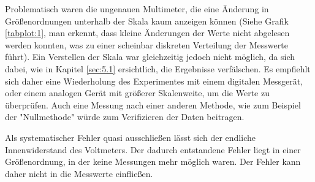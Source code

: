 Problematisch waren die ungenauen Multimeter, die eine Änderung in Größenordnungen unterhalb
der Skala kaum anzeigen können (Siehe Grafik \ref{tabplot:1}, man erkennt, dass kleine Änderungen
der Werte nicht abgelesen werden konnten, was zu einer scheinbar diskreten Verteilung der Messwerte führt).
Ein Verstellen der Skala war gleichzeitig jedoch nicht möglich, da sich dabei,
wie in Kapitel \ref{sec:5.1} ersichtlich, die Ergebnisse verfälschen. Es empfiehlt sich daher
eine Wiederholung des Experimentes mit einem digitalen Messgerät, oder einem analogen Gerät mit
größerer Skalenweite, um die Werte zu überprüfen. Auch eine Messung nach einer anderen Methode, wie
zum Beispiel der "Nullmethode" würde zum Verifizieren der Daten beitragen.

Als systematischer Fehler quasi ausschließen lässt sich der endliche Innenwiderstand des Voltmeters.
Der dadurch entstandene Fehler liegt in einer Größenordnung, in der keine Messungen mehr möglich
waren. Der Fehler kann daher nicht in die Messwerte einfließen.
\newpage
\nocite{*}
\printbibliography
